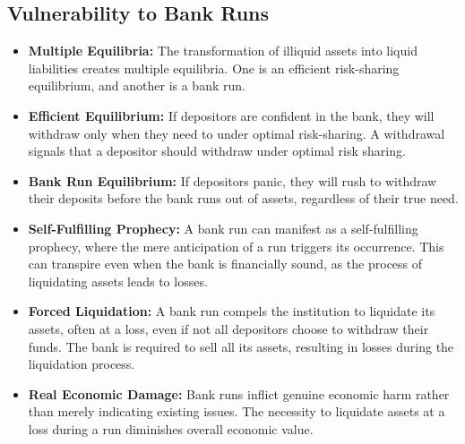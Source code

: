 \subsection{Vulnerability to Bank Runs}
\begin{itemize}
    \item \textbf{Multiple Equilibria:} The transformation of illiquid assets into liquid liabilities creates multiple equilibria. One is an efficient risk-sharing equilibrium, and another is a bank run.
    \item \textbf{Efficient Equilibrium:} If depositors are confident in the bank, they will withdraw only when they need to under optimal risk-sharing. A withdrawal signals that a depositor should withdraw under optimal risk sharing.
    \item \textbf{Bank Run Equilibrium:} If depositors panic, they will rush to withdraw their deposits before the bank runs out of assets, regardless of their true need.
    \item \textbf{Self-Fulfilling Prophecy:} A bank run can manifest as a self-fulfilling prophecy, where the mere anticipation of a run triggers its occurrence. This can transpire even when the bank is financially sound, as the process of liquidating assets leads to losses.
    \item \textbf{Forced Liquidation:} A bank run compels the institution to liquidate its assets, often at a loss, even if not all depositors choose to withdraw their funds. The bank is required to sell all its assets, resulting in losses during the liquidation process.
    \item \textbf{Real Economic Damage:} Bank runs inflict genuine economic harm rather than merely indicating existing issues. The necessity to liquidate assets at a loss during a run diminishes overall economic value.
\end{itemize}

